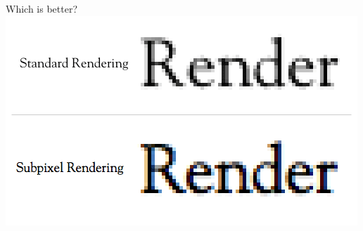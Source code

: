 \documentclass{lug}
\begin{document}
\begin{frame}{Which is better?}
    \includegraphics[width=\textwidth]{graphics/subpixel_side_by_side}
\end{frame}
\end{document}
